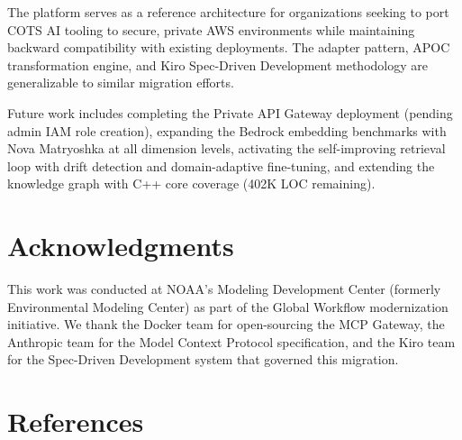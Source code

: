 \documentclass[11pt,letterpaper]{article}
\begin{document}
The platform serves as a reference architecture for organizations seeking
to port COTS AI tooling to secure, private AWS environments while
maintaining backward compatibility with existing deployments. The adapter
pattern, APOC transformation engine, and Kiro Spec-Driven Development
methodology are generalizable to similar migration efforts.

Future work includes completing the Private API Gateway deployment (pending
admin IAM role creation), expanding the Bedrock embedding benchmarks with
Nova Matryoshka at all dimension levels, activating the self-improving
retrieval loop with drift detection and domain-adaptive fine-tuning, and
extending the knowledge graph with C++ core coverage (402K LOC remaining).

\section*{Acknowledgments}

This work was conducted at NOAA's Modeling Development Center (formerly
Environmental Modeling Center) as part of the Global Workflow modernization
initiative. We thank the Docker team for open-sourcing the MCP Gateway,
the Anthropic team for the Model Context Protocol specification, and the
Kiro team for the Spec-Driven Development system that governed this
migration.

\section*{References}
\end{document}
